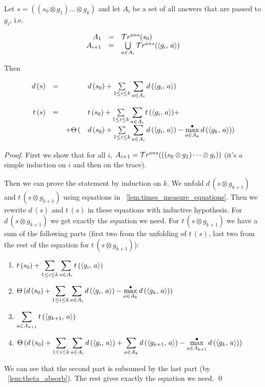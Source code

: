 \begin{lemma}
\label{lem:times_gen_measure_approximations}

Let $s = ((s_0 \otimes g_1) \dots \otimes g_k)$ and let $A_i$ be a set of all answers that are passed to $g_i$, i.e.

\[
\begin{array}{rcl}
A_1 &=& \mathcal{T}r^{ans}(s_0) \\
A_{i + 1} & = & \bigcup\limits_{a \in A_i} \mathcal{T}r^{ans}(\langle g_i ,\, a \rangle) 
\end{array}
\]

Then

\[
\begin{array}{rcrl}
d\,(s) &=& & d\,(s_0) + \sum\limits_{1 \le i \le k} \displaystyle\sum\limits_{a \in A_i} d\,(\langle g_i ,\, a \rangle) \\
\\
t\,(s) &=& & t\,(s_0) + \sum\limits_{1 \le i \le k} \displaystyle\sum\limits_{a \in A_i} t\,(\langle g_i ,\, a \rangle) + \\
& & + \Theta\,(& d\,(s_0) + \sum\limits_{1 \le i \le k} \displaystyle\sum\limits_{a \in A_i} d\,(\langle g_i ,\, a \rangle) - \max^{\bullet}\limits_{a \in A_k}  d\,(\langle g_k ,\, a \rangle)) \\
\end{array}
\]

\end{lemma}
\begin{proof}
First we show that for all $i$, $A_{i + 1} = \mathcal{T}r^{ans}(((s_0 \otimes g_1) \dots \otimes g_i))$ (it's a simple induction on $i$ and then on the trace).

Then we can prove the statement by induction on $k$.
We unfold $d\,(s \otimes g_{k+1})$ and $t\,(s \otimes g_{k+1})$ using equations in \lemmaword~\ref{lem:times_measure_equations}.
Then we rewrite $d\,(s)$ and $t\,(s)$ in these equations with inductive hypothesis.
For $d\,(s \otimes g_{k+1})$ we get exactly the equation we need.
For $t\,(s \otimes g_{k+1})$ we have a sum of the following parts (first two from the unfolding of $t\,(s)$, last two from the rest of the equation for $t\,(s \otimes g_{k+1})$):
\begin{enumerate}
\item $t\,(s_0) + \displaystyle{\sum\limits_{1 \le i \le k}} \displaystyle\sum\limits_{a \in A_i} t\,(\langle g_i ,\, a \rangle)$
\item $ \Theta\,(d\,(s_0) +  \displaystyle{\sum\limits_{1 \le i \le k}} \displaystyle\sum\limits_{a \in A_i} d\,(\langle g_i ,\, a \rangle) - \max^{\bullet}\limits_{a \in A_k}  d\,(\langle g_k ,\, a \rangle))$
\item $\displaystyle\sum\limits_{a \in A_{k+1}} t\,(\langle g_{k+1} ,\, a \rangle)$
\item $ \Theta\,(d\,(s_0) +  \displaystyle{\sum\limits_{1 \le i \le k}} \displaystyle\sum\limits_{a \in A_i} d\,(\langle g_i ,\, a \rangle) + \displaystyle\sum\limits_{a \in A_k} d\,(\langle g_{k+1} ,\, a \rangle) - \max^{\bullet}\limits_{a \in A_{k + 1}}  d\,(\langle g_k ,\, a \rangle))$
\end{enumerate}

We can see that the second part is subsumed by the last part (by \lemmaword~\ref{lem:theta_absorb}). The rest gives exactly the equation we need.
\qed
\end{proof}


